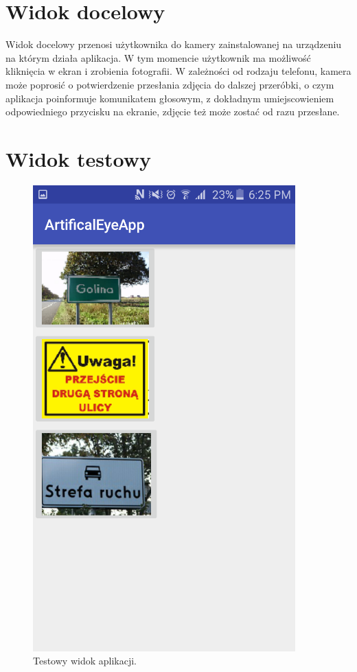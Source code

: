 \documentclass[eng,oneside]{mgr}
\begin{document}
\section {Widok docelowy}
Widok docelowy przenosi użytkownika do kamery zainstalowanej na urządzeniu na którym działa aplikacja. W tym momencie użytkownik ma możliwość kliknięcia w ekran i zrobienia fotografii. W zależności od rodzaju telefonu, kamera może poprosić o potwierdzenie przesłania zdjęcia do dalszej przeróbki, o czym aplikacja poinformuje komunikatem głosowym, z dokładnym umiejscowieniem odpowiedniego przycisku na ekranie, zdjęcie też może zostać od razu przesłane.
\section {Widok testowy}
\begin{figure}[htbp]
\centering
\includegraphics{widoktest.png}
\caption{Testowy widok aplikacji.}\par\medskip
\end{figure}
\end{document}
